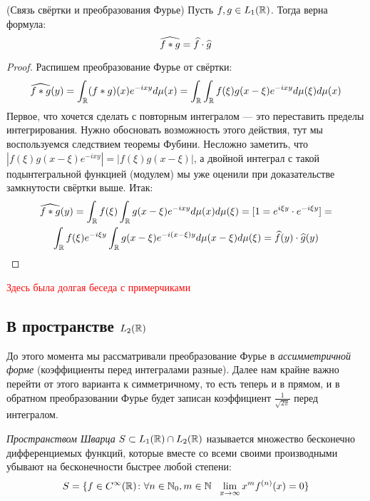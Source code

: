 \begin{proposition} (Связь свёртки и преобразования Фурье)
	Пусть $f, g \in L_1(\mathbb{R})$. Тогда верна формула:
	\[
		\widehat{f * g} = \widehat{f} \cdot \widehat{g} 
	\]
\end{proposition}

\begin{proof}
	Распишем преобразование Фурье от свёртки:
	\[
		\widehat{f * g}(y) = \int_{\mathbb{R}} (f * g)(x)e^{-ixy}d\mu(x) = \int_{\mathbb{R}} \int_{\mathbb{R}} f(\xi)g(x - \xi)e^{-ixy}d\mu(\xi)d\mu(x)
	\]
	Первое, что хочется сделать с повторным интегралом --- это переставить пределы интегрирования. Нужно обосновать возможность этого действия, тут мы воспользуемся следствием теоремы Фубини. Несложно заметить, что $|f(\xi)g(x - \xi)e^{-ixy}| = |f(\xi)g(x - \xi)|$, а двойной интеграл с такой подынтегральной функцией (модулем) мы уже оценили при доказательстве замкнутости свёртки выше. Итак:
	\begin{multline*}
		\widehat{f * g}(y) = \int_{\mathbb{R}} f(\xi) \int_{\mathbb{R}} g(x - \xi)e^{-ixy}d\mu(x)d\mu(\xi) = [1 = e^{i\xi y} \cdot e^{-i\xi y}] =
		\\
		\int_{\mathbb{R}} f(\xi)e^{-i\xi y} \int_{\mathbb{R}} g(x - \xi)e^{-i(x - \xi)y}d\mu(x - \xi)d\mu(\xi) = \widehat{f}(y) \cdot \widehat{g}(y)
	\end{multline*}
	 
\end{proof}

\textcolor{red}{Здесь была долгая беседа с примерчиками}

\subsection{В пространстве $L_2(\mathbb{R})$}

\begin{note}
	До этого момента мы рассматривали преобразование Фурье в \textit{ассимметричной форме} (коэффициенты перед интегралами разные). Далее нам крайне важно перейти от этого варианта к симметричному, то есть теперь и в прямом, и в обратном преобразовании Фурье будет записан коэффициент $\frac{1}{\sqrt{2\pi}}$ перед интегралом.
\end{note}

\begin{reminder}
	\textit{Пространством Шварца} $S \subset L_1(\mathbb{R}) \cap L_2(\mathbb{R})$ называется множество бесконечно дифференциемых функций, которые вместе со всеми своими производными убывают на бесконечности быстрее любой степени:
	\[
		S = \{f \in C^\infty(\mathbb{R}) \colon \forall n \in \mathbb{N}_0, m \in \mathbb{N}\ \ \lim_{x \to \infty} x^mf^{(n)}(x) = 0\}
	\]
\end{reminder}

